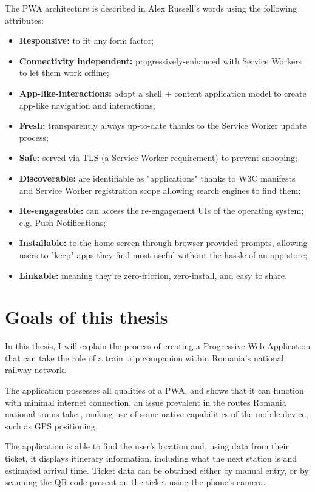 The PWA architecture is described in Alex Russell's words using the following attributes: \cite{PWAShortHist}
\begin{itemize}
    \item \textbf{Responsive:} to fit any form factor;
    \item \textbf{Connectivity independent:} progressively-enhanced with Service Workers to let them work offline;
    \item \textbf{App-like-interactions:} adopt a shell + content application model to create app-like navigation and interactions;
    \item \textbf{Fresh:} transparently always up-to-date thanks to the Service Worker update process;
    \item \textbf{Safe:} served via TLS (a Service Worker requirement) to prevent snooping;
    \item \textbf{Discoverable:} are identifiable as "applications" thanks to W3C manifests and Service Worker registration scope allowing search engines to find them;
    \item \textbf{Re-engageable:} can access the re-engagement UIs of the operating system; e.g. Push Notifications;
    \item \textbf{Installable:} to the home screen through browser-provided prompts, allowing users to "keep" apps they find most useful without the hassle of an app store;
    \item \textbf{Linkable:} meaning they're zero-friction, zero-install, and easy to share.
\end{itemize}

\section{Goals of this thesis}

In this thesis, I will explain the process of creating a Progressive Web Application that can take the role of a train trip companion within Romania's national railway network.

The application possesses all qualities of a PWA, and shows that it can function with minimal internet connection, an issue prevalent in the routes Romania national trains take \cite{CFRInternetIC}, making use of some native capabilities of the mobile device, such as GPS positioning.

The application is able to find the user's location and, using data from their ticket, it displays itinerary information, including what the next station is and estimated arrival time. Ticket data can be obtained either by manual entry, or by scanning the QR code present on the ticket using the phone's camera.

